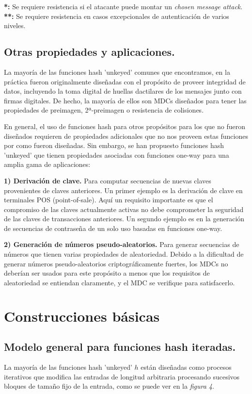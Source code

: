 \documentclass[a4paper, 12pt]{article} %
\begin{document}
\textbf{*:} Se requiere resistencia si el atacante puede montar un \textit{chosen message attack}.\\

\textbf{**:} Se requiere resistencia en casos excepcionales de autenticación de varios niveles.

\newpage
\subsection{Otras propiedades y aplicaciones.}
La mayoría de las funciones hash 'unkeyed' comunes que encontramos, en la práctica fueron
originalmente diseñadas con el propósito de proveer integridad de datos, incluyendo la toma
digital de huellas dactilares de los mensajes junto con firmas digitales. De hecho, la mayoría
de ellos son MDCs diseñados para tener las propiedades de preimagen, 2ª-preimagen o resistencia
de colisiones.

En general, el uso de funciones hash para otros propósitos para los que no fueron diseñados
requieren de propiedades adicionales que no nos proveen estas funciones por como fueron diseñadas.
Sin embargo, se han propuesto funciones hash 'unkeyed' que tienen propiedades asociadas con
funciones one-way para una amplia gama de aplicaciones:

\textbf{1) Derivación de clave.} Para computar secuencias de nuevas claves provenientes de claves anteriores.
Un primer ejemplo es la derivación de clave en terminales POS (point-of-sale). Aquí un requisito
importante es que el compromiso de las claves actualmente activas no debe comprometer la seguridad
de las claves de transacciones anteriores. Un segundo ejemplo es en la generación de secuencias
de contraseña de un solo uso basadas en funciones one-way.

\textbf{2) Generación de números pseudo-aleatorios.} Para generar secuencias de números que tienen varias
propiedades de aleatoriedad. Debido a la dificultad de generar números pseudo-aleatorios
criptográficamente fuertes, los MDCs no deberían ser usados para este propósito a menos que los
requisitos de aleatoriedad se entiendan claramente, y el MDC se verifique para satisfacerlo.

\newpage
\section{Construcciones básicas}
\subsection{Modelo general para funciones hash iteradas.}
La mayoría de las funciones hash 'unkeyed' $h$ están diseñadas como procesos iterativos que modifica
las entradas de longitud arbitraria procesando sucesivos bloques de tamaño fijo de la entrada, como
se puede ver en la \textit{figura 4}.
\end{document}
